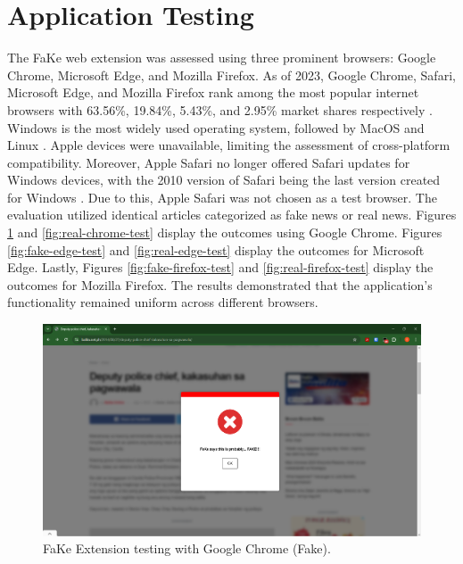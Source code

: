 \section{Application Testing}
The FaKe web extension was assessed using three prominent browsers: Google Chrome, Microsoft Edge, and Mozilla Firefox. As of 2023, Google Chrome, Safari, Microsoft Edge, and Mozilla Firefox rank among the most popular internet browsers with 63.56\%, 19.84\%, 5.43\%, and 2.95\%  market shares respectively \cite{statista2024}. Windows is the most widely used operating system, followed by MacOS and Linux \cite{inproceedings}. Apple devices were unavailable, limiting the assessment of cross-platform compatibility. Moreover, Apple Safari no longer offered Safari updates for Windows devices, with the 2010 version of Safari being the last version created for Windows \cite{apple2024}. Due to this, Apple Safari was not chosen as a test browser. The evaluation utilized identical articles categorized as fake news or real news. Figures \ref{fig:fake-chrome-test} and \ref{fig:real-chrome-test} display the outcomes using Google Chrome. Figures \ref{fig:fake-edge-test} and \ref{fig:real-edge-test} display the outcomes for Microsoft Edge. Lastly, Figures \ref{fig:fake-firefox-test} and \ref{fig:real-firefox-test} display the outcomes for Mozilla Firefox. The results demonstrated that the application's functionality remained uniform across different browsers.

    \begin{figure}[h!]
        \centering
        \includegraphics[width=1\textwidth,height=1\textheight, keepaspectratio]{figures/Screenshots/chrome-fake.png}
            \caption{FaKe Extension testing with Google Chrome (Fake).}
            \label{fig:fake-chrome-test}
        \end{figure}

